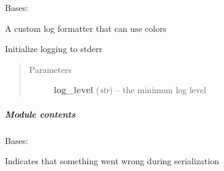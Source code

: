 \documentclass[letterpaper,10pt,english]{sphinxmanual}
\begin{document}
\begin{fulllineitems}
\label{ambrosia.util:ambrosia.util.log.AmbrosiaFormater}
Bases: 

A custom log formatter that can use colors

\begin{fulllineitems}
\label{ambrosia.util:ambrosia.util.log.AmbrosiaFormater.color_mapping}
\end{fulllineitems}


\begin{fulllineitems}
\label{ambrosia.util:ambrosia.util.log.AmbrosiaFormater.format}
\end{fulllineitems}


\end{fulllineitems}


\begin{fulllineitems}
\label{ambrosia.util:ambrosia.util.log.init_logging}
Initialize logging to stderr
\begin{quote}\begin{description}
\item[{Parameters}] \leavevmode
\textbf{log\_level} (\emph{str}) -- the minimum log level

\end{description}\end{quote}

\end{fulllineitems}



\subparagraph{Module contents}
\label{ambrosia.util:module-contents}\label{ambrosia.util:module-ambrosia.util}

\begin{fulllineitems}
\label{ambrosia.util:ambrosia.util.SerializationError}
Bases: 

Indicates that something went wrong during serialization

\end{fulllineitems}
\end{document}
